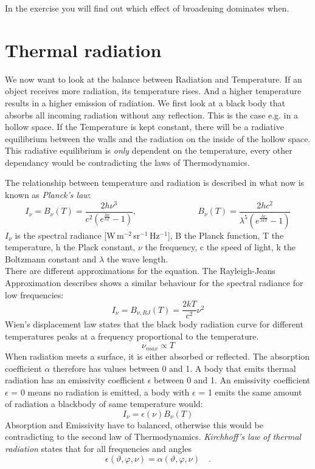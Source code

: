 In the exercise you will find out which effect of broadening dominates when. 


\section{Thermal radiation}

We now want to look at the balance between Radiation and Temperature. If an object receives more radiation, its temperature rises. And a higher temperature results in a higher emission of radiation. We first look at a black body that absorbs all incoming radiation without any reflection. This is the case e.g. in a hollow space. If the Temperature is kept constant, there will be a radiative equilibrium between the walls and the radiation on the inside of the hollow space. This radiative equilibrium is \textit{only} dependent on the temperature, every other dependancy would be contradicting the laws of Thermodynamics.

The relationship between temperature and radiation is described in what now is known as \textit{Planck's law}:
\begin{equation}
I_{\nu} = B_{\nu}(T) = \frac{2h\nu^3}{c^2(e^{\frac{h\nu}{kT}}-1)}, 
               \hspace{3cm} B_{\nu}(T) = \frac{2hc^2}{\lambda^5(e^{\frac{hc}{\lambda kT}}-1)}
\end{equation}
$I_\nu$ is the spectral radiance [W\,m$^{-2}$\,sr$^{-1}$\,Hz$^{-1}$], B the Planck function, T the temperature, h the  Plack constant, $\nu$ the frequency, c the speed of light, k the Boltzmann constant and $\lambda$ the wave length.\\
There are different approximations for the equation. The Rayleigh-Jeans Approximation describes shows a similar behaviour for the spectral radiance for low frequencies:
\begin{equation}
I_{\nu} = B_{\nu, RJ}(T) = \frac{2kT}{c^2}\nu^2
\end{equation}
Wien's displacement law states that the black body radiation curve for different temperatures peaks at a frequency proportional to the temperature.
\begin{equation}
\nu_{max} \propto T
\end{equation}
When radiation meets a surface, it is either absorbed or reflected. The absorption coefficient $\alpha$ therefore has values between 0 and 1. A body that emits thermal radiation has an emissivity coefficient $\epsilon$ between 0 and 1. An emissivity coefficient $\epsilon$ = 0 means no radiation is emitted, a body with $\epsilon$ = 1 emits the same amount of radiation a blackbody of same temperature would:
\begin{equation}
I_\nu = \epsilon(\nu)B_\nu(T)
\end{equation}
Absorption and Emissivity have to balanced, otherwise this would be contradicting to the second law of Thermodynamics. \textit{Kirchhoff's law of thermal radiation} states that for all frequencies and angles 
\begin{equation}
\epsilon(\vartheta,\varphi,\nu) = \alpha(\vartheta,\varphi,\nu) \quad .
\end{equation}

